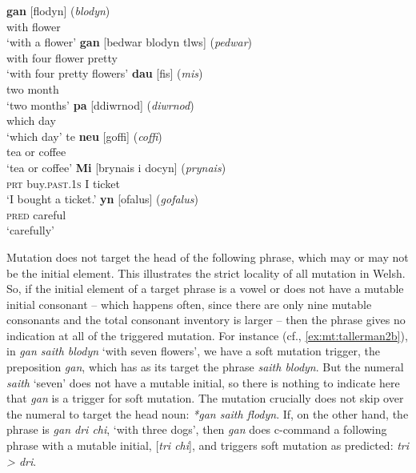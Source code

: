 \documentclass[output=paper,colorlinks,citecolor=brown]{langscibook}
\begin{document}
\ea\label{ex:mt:tallerman2}
\ea \label{ex:mt:tallerman2a}
\gll \textbf{gan} [flodyn] (\textit{blodyn})\\
with flower\\
\glt ‘with a flower’
\ex\label{ex:mt:tallerman2b}
\gll \textbf{gan} [bedwar blodyn tlws] (\textit{pedwar})\\
with four flower pretty\\
\glt ‘with four pretty flowers’
\ex\label{ex:mt:tallerman2c}
\gll \textbf{dau} [fis] (\textit{mis})\\
two month\\
\glt ‘two months’
\ex\label{ex:mt:tallerman2d}
\gll \textbf{pa} [ddiwrnod] (\textit{diwrnod})\\
which day\\
\glt ‘which day’
\ex\label{ex:mt:tallerman2e}
\gll  te \textbf{neu} [goffi] (\textit{coffi})\\
tea or coffee\\
\glt ‘tea or coffee’
\ex\label{ex:mt:tallerman2f}
\gll  \textbf{Mi} [brynais i docyn] (\textit{prynais})\\
\textsc{prt} buy.\textsc{past.1s} \textsc{I} ticket\\
\glt ‘I bought a ticket.’
\ex\label{ex:mt:tallerman2g}
\gll \textbf{yn} [ofalus] (\textit{gofalus})\\
\textsc{pred} careful\\
\glt ‘carefully’
\z
\z
    

Mutation does not target the head of the following phrase, which may or may not be the initial element. This illustrates the strict locality of all mutation in Welsh. So, if the initial element of a target phrase is a vowel or does not have a mutable initial consonant – which happens often, since there are only nine mutable consonants and the total consonant inventory is larger – then the phrase gives no indication at all of the triggered mutation. For instance (cf., \ref{ex:mt:tallerman2b}), in \textit{gan saith blodyn} ‘with seven flowers’, we have a soft mutation trigger, the preposition \textit{gan}, which has as its target the phrase \textit{saith blodyn}. But the numeral \textit{saith} ‘seven’ does not have a mutable initial, so there is nothing to indicate here that \textit{gan} is a trigger for soft mutation. The mutation crucially does not skip over the numeral to target the head noun: \textit{*gan saith flodyn}. If, on the other hand, the phrase is \textit{gan dri chi}, ‘with three dogs’, then \textit{gan} does c-command a following phrase with a mutable initial, [\textit{tri chi}], and triggers soft mutation as predicted: \textit{tri > dri}. 
\end{document}
